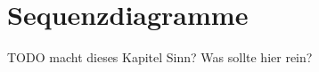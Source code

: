 \section{Sequenzdiagramme}
\label{sec:architektur.Sequenzdiagramme}
TODO macht dieses Kapitel Sinn? Was sollte hier rein?